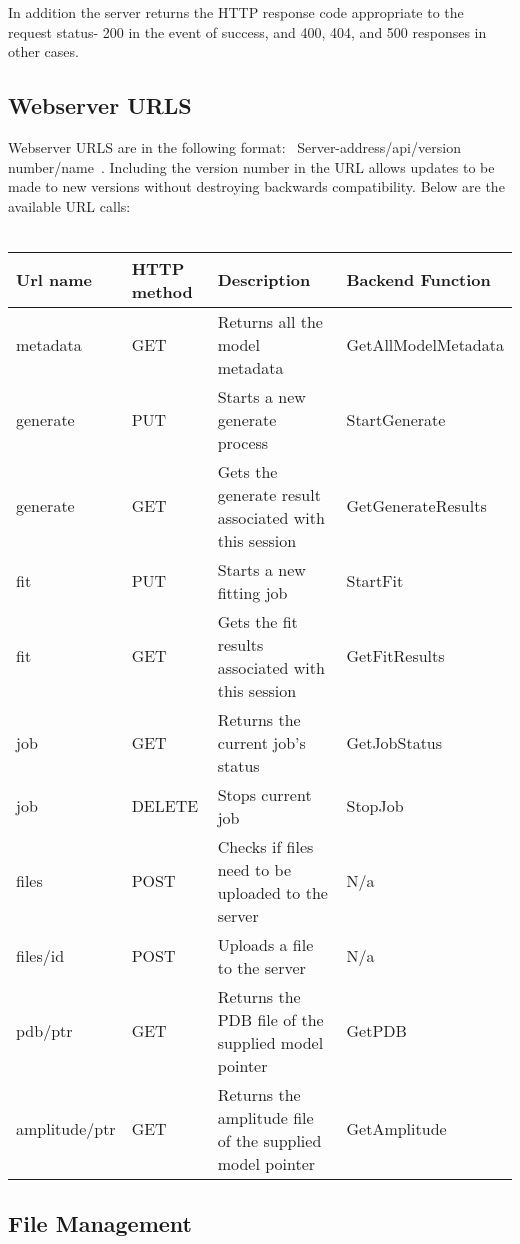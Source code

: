 \documentclass[12pt]{article}
\begin{document}
In addition the server returns the HTTP response code appropriate to the request status- 200 in the event of success, and 400, 404, and 500 responses in other cases.

\subsection{Webserver URLS}
Webserver URLS are in the following format: ~Server-address/api/version number/name~.
Including the version number in the URL allows updates to be made to new versions without destroying backwards compatibility.
Below are the available URL calls:
\\
\\

\begin{tabular}{|l|p{1.7cm}|p{5.5cm}|l}
	\hline
	\textbf{Url name} & \textbf{HTTP method} & \textbf{Description}& \textbf{Backend Function} \\ \hline
	metadata & GET & Returns all the model metadata & GetAllModelMetadata\\ \hline
	generate & PUT & Starts a new generate process & StartGenerate \\\hline
	generate & GET & Gets the generate result associated with this session & GetGenerateResults\\ \hline 
	fit & PUT & Starts a new fitting job &StartFit \\ \hline
	fit & GET & Gets the fit results associated with this session &GetFitResults\\ \hline 
	job & GET & Returns the current job's status &GetJobStatus \\ \hline
	job & DELETE & Stops current job &StopJob\\ \hline
	files& POST & Checks if files need to be uploaded to the server & N/a\\ \hline
	files/id & POST & Uploads a file to the server & N/a\\\hline
	pdb/ptr & GET & Returns the PDB file of the supplied model pointer &GetPDB\\ \hline
	amplitude/ptr & GET & Returns the amplitude file of the supplied model pointer &GetAmplitude \\ \hline
\end{tabular}

\subsection{File Management}
\end{document}
